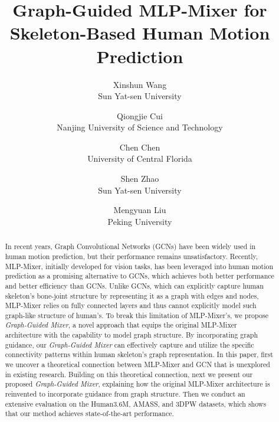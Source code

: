 \documentclass[10pt,twocolumn,letterpaper]{article}
\begin{document}
\title{Graph-Guided MLP-Mixer for Skeleton-Based Human Motion Prediction}


\author{Xinshun Wang\\
Sun Yat-sen University\\
\and
Qiongjie Cui\\
Nanjing University of Science and Technology\\
\and
Chen Chen\\
University of Central Florida\\
\and
Shen Zhao\\
Sun Yat-sen University\\
\and
Mengyuan Liu\\
Peking University\\
}



\maketitle
\ificcvfinal\thispagestyle{empty}\fi



\begin{abstract}

    In recent years, Graph Convolutional Networks (GCNs) have been widely used in human motion prediction, but their performance remains unsatisfactory.
    Recently, MLP-Mixer, initially developed for vision tasks, has been leveraged into human motion prediction as a promising alternative to GCNs, which achieves both better performance and better efficiency than GCNs.
Unlike GCNs, which can explicitly capture human skeleton's bone-joint structure by representing it as a graph with edges and nodes, MLP-Mixer relies on fully connected layers and thus cannot explicitly model such graph-like structure of human's.
To break this limitation of MLP-Mixer's, we propose \textit{Graph-Guided Mixer}, a novel approach that equips the original MLP-Mixer architecture with the capability to model graph structure.
By incorporating graph guidance, our \textit{Graph-Guided Mixer} can effectively capture and utilize the specific connectivity patterns within human skeleton's graph representation.
In this paper, first we uncover a theoretical connection between MLP-Mixer and GCN that is unexplored in existing research. Building on this theoretical connection, next we present our proposed \textit{Graph-Guided Mixer}, explaining how the original MLP-Mixer architecture is reinvented to incorporate guidance from graph structure.
Then we conduct an extensive evaluation on the Human3.6M, AMASS, and 3DPW datasets, which shows that our method achieves state-of-the-art performance.
\end{abstract}
\end{document}
